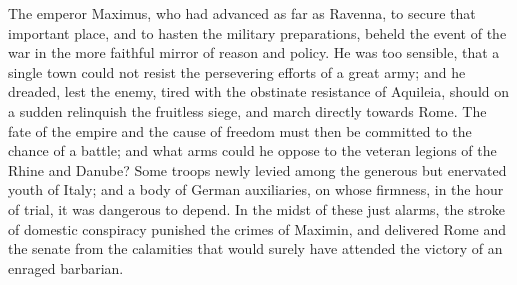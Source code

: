 
The emperor Maximus, who had advanced as far as Ravenna, to
secure that important place, and to hasten the military
preparations, beheld the event of the war in the more faithful
mirror of reason and policy. He was too sensible, that a single
town could not resist the persevering efforts of a great army;
and he dreaded, lest the enemy, tired with the obstinate
resistance of Aquileia, should on a sudden relinquish the
fruitless siege, and march directly towards Rome. The fate of the
empire and the cause of freedom must then be committed to the
chance of a battle; and what arms could he oppose to the veteran
legions of the Rhine and Danube? Some troops newly levied among
the generous but enervated youth of Italy; and a body of German
auxiliaries, on whose firmness, in the hour of trial, it was
dangerous to depend. In the midst of these just alarms, the
stroke of domestic conspiracy punished the crimes of Maximin, and
delivered Rome and the senate from the calamities that would
surely have attended the victory of an enraged barbarian.

